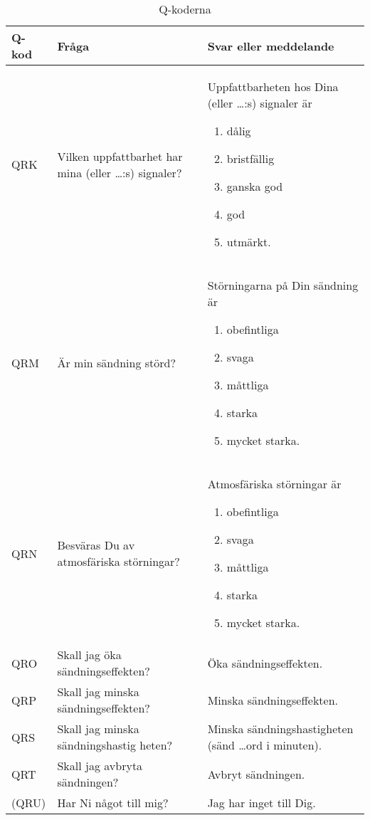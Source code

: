\begin{table}
  \label{tab:q-kod}
  \caption{Q-koderna}
  \begin{tabular}{lp{6cm}p{6cm}}
    Q-kod & Fråga & Svar eller meddelande \\
    \hline
    QRK &
    Vilken uppfattbarhet har mina (eller \dots:s) signaler?
    &
    Uppfattbarheten hos Dina (eller \dots:s) signaler är
    \begin{enumerate}
    \item dålig
    \item bristfällig
    \item ganska god
    \item god
    \item utmärkt.
    \end{enumerate}
    \\
    QRM &
    Är min sändning störd?
    &
    Störningarna på Din sändning är
    \begin{enumerate}
    \item obefintliga
    \item svaga
    \item måttliga
    \item starka
    \item mycket starka.
    \end{enumerate}
    \\
    QRN
    &
    Besväras Du av atmosfäriska störningar?
    &
    Atmosfäriska störningar är
    \begin{enumerate}
    \item obefintliga
    \item svaga
    \item måttliga
    \item starka
    \item mycket starka.
    \end{enumerate}
    \\
    QRO
    &
    Skall jag öka sändningseffekten?
    &
    Öka sändningseffekten.
    \\
    QRP
    &
    Skall jag minska sändningseffekten?
    &
    Minska sändningseffekten.
    \\
    QRS
    &
    Skall jag minska sändningshastig heten?
    &
    Minska sändningshastigheten
    (sänd \dots ord i minuten).
    \\
    QRT
    &
    Skall jag avbryta sändningen?
    &
    Avbryt sändningen.
    \\
    (QRU)
    &
    Har Ni något till mig?
    &
    Jag har inget till Dig.

\end{tabular}
\end{table}
